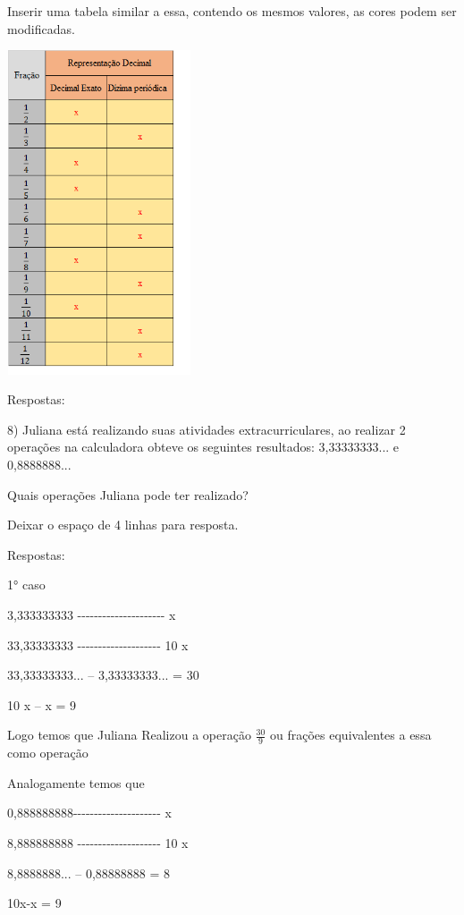 Inserir uma tabela similar a essa, contendo os mesmos valores, as cores
podem ser modificadas.

\includegraphics[width=2.14722in,height=3.775in]{./imgSAEB_8_MAT/media/image4.png}

Respostas:

8) Juliana está realizando suas atividades extracurriculares, ao
realizar 2 operações na calculadora obteve os seguintes resultados:
3,33333333... e 0,8888888...

Quais operações Juliana pode ter realizado?

Deixar o espaço de 4 linhas para resposta.

Respostas:

1° caso

3,333333333
-\/-\/-\/-\/-\/-\/-\/-\/-\/-\/-\/-\/-\/-\/-\/-\/-\/-\/-\/-\/- x

33,33333333 -\/-\/-\/-\/-\/-\/-\/-\/-\/-\/-\/-\/-\/-\/-\/-\/-\/-\/-\/-
10 x

33,33333333... -- 3,33333333... = 30

10 x -- x = 9

Logo temos que Juliana Realizou a operação \(\frac{30}{9}\) ou frações
equivalentes a essa como operação

Analogamente temos que

0,888888888-\/-\/-\/-\/-\/-\/-\/-\/-\/-\/-\/-\/-\/-\/-\/-\/-\/-\/-\/-\/-
x

8,888888888 -\/-\/-\/-\/-\/-\/-\/-\/-\/-\/-\/-\/-\/-\/-\/-\/-\/-\/-\/-
10 x

8,8888888... -- 0,88888888 = 8

10x-x = 9

